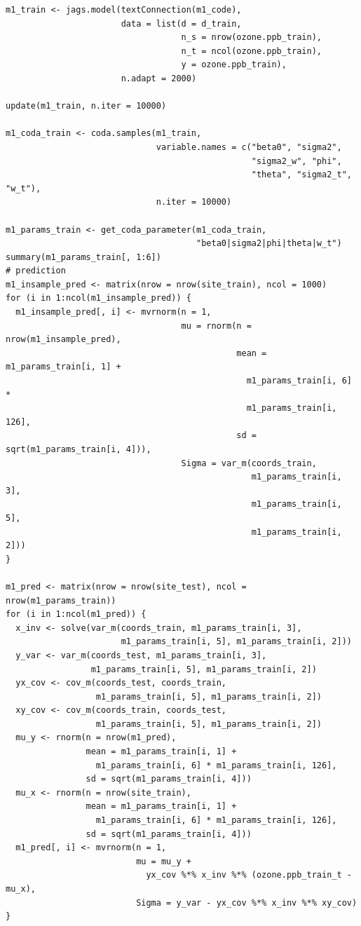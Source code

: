 \documentclass[12pt]{article}
\begin{document}
\begin{verbatim}
m1_train <- jags.model(textConnection(m1_code), 
                       data = list(d = d_train, 
                                   n_s = nrow(ozone.ppb_train), 
                                   n_t = ncol(ozone.ppb_train), 
                                   y = ozone.ppb_train), 
                       n.adapt = 2000)

update(m1_train, n.iter = 10000)

m1_coda_train <- coda.samples(m1_train, 
                              variable.names = c("beta0", "sigma2", 
                                                 "sigma2_w", "phi", 
                                                 "theta", "sigma2_t", "w_t"), 
                              n.iter = 10000)

m1_params_train <- get_coda_parameter(m1_coda_train, 
                                      "beta0|sigma2|phi|theta|w_t")
summary(m1_params_train[, 1:6])
# prediction
m1_insample_pred <- matrix(nrow = nrow(site_train), ncol = 1000)
for (i in 1:ncol(m1_insample_pred)) {
  m1_insample_pred[, i] <- mvrnorm(n = 1, 
                                   mu = rnorm(n = nrow(m1_insample_pred), 
                                              mean = m1_params_train[i, 1] + 
                                                m1_params_train[i, 6] * 
                                                m1_params_train[i, 126], 
                                              sd = sqrt(m1_params_train[i, 4])), 
                                   Sigma = var_m(coords_train, 
                                                 m1_params_train[i, 3], 
                                                 m1_params_train[i, 5], 
                                                 m1_params_train[i, 2]))
}

m1_pred <- matrix(nrow = nrow(site_test), ncol = nrow(m1_params_train))
for (i in 1:ncol(m1_pred)) {
  x_inv <- solve(var_m(coords_train, m1_params_train[i, 3], 
                       m1_params_train[i, 5], m1_params_train[i, 2]))
  y_var <- var_m(coords_test, m1_params_train[i, 3], 
                 m1_params_train[i, 5], m1_params_train[i, 2])
  yx_cov <- cov_m(coords_test, coords_train, 
                  m1_params_train[i, 5], m1_params_train[i, 2])
  xy_cov <- cov_m(coords_train, coords_test, 
                  m1_params_train[i, 5], m1_params_train[i, 2])
  mu_y <- rnorm(n = nrow(m1_pred), 
                mean = m1_params_train[i, 1] + 
                  m1_params_train[i, 6] * m1_params_train[i, 126], 
                sd = sqrt(m1_params_train[i, 4]))
  mu_x <- rnorm(n = nrow(site_train), 
                mean = m1_params_train[i, 1] + 
                  m1_params_train[i, 6] * m1_params_train[i, 126], 
                sd = sqrt(m1_params_train[i, 4]))
  m1_pred[, i] <- mvrnorm(n = 1, 
                          mu = mu_y + 
                            yx_cov %*% x_inv %*% (ozone.ppb_train_t - mu_x), 
                          Sigma = y_var - yx_cov %*% x_inv %*% xy_cov)
}
\end{verbatim}
\end{document}
